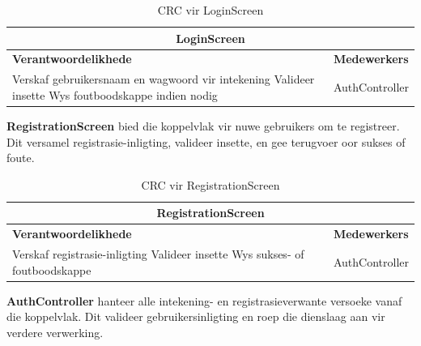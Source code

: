 \begin{table}[H]
\centering
\begin{tabular}{|p{}|p{}|}
    \hline
    \multicolumn{2}{|c|}{\textbf{LoginScreen}} \\
    \hline
    \textbf{Verantwoordelikhede} & \textbf{Medewerkers} \\
    \hline
    Verskaf gebruikersnaam en wagwoord vir intekening \newline
    Valideer insette \newline
    Wys foutboodskappe indien nodig
    &
    AuthController \\
    \hline
\end{tabular}
\caption{CRC vir LoginScreen}
\label{tab:crc_login_screen}
\end{table}
\vspace{1em}

\textbf{RegistrationScreen} bied die koppelvlak vir nuwe gebruikers om te registreer. Dit versamel registrasie-inligting, valideer insette, en gee terugvoer oor sukses of foute.

\begin{table}[H]
\centering
\begin{tabular}{|p{}|p{}|}
    \hline
    \multicolumn{2}{|c|}{\textbf{RegistrationScreen}} \\
    \hline
    \textbf{Verantwoordelikhede} & \textbf{Medewerkers} \\
    \hline
    Verskaf registrasie-inligting \newline
    Valideer insette \newline
    Wys sukses- of foutboodskappe
    &
    AuthController \\
    \hline
\end{tabular}
\caption{CRC vir RegistrationScreen}
\label{tab:crc_registration_screen}
\end{table}
\vspace{1em}

\textbf{AuthController} hanteer alle intekening- en registrasieverwante versoeke vanaf die koppelvlak. Dit valideer gebruikersinligting en roep die dienslaag aan vir verdere verwerking.

